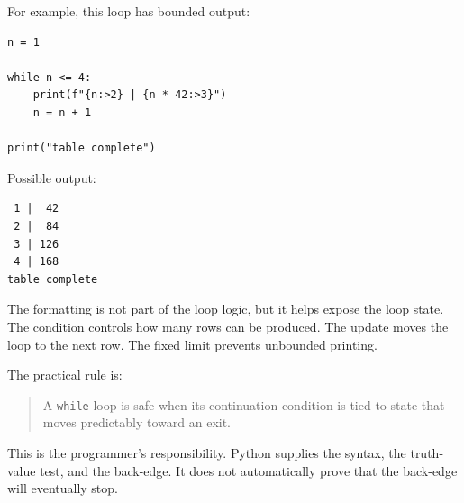 For example, this loop has bounded output:

\begin{verbatim}
n = 1

while n <= 4:
    print(f"{n:>2} | {n * 42:>3}")
    n = n + 1

print("table complete")
\end{verbatim}

Possible output:

\begin{verbatim}
 1 |  42
 2 |  84
 3 | 126
 4 | 168
table complete
\end{verbatim}

The formatting is not part of the loop logic, but it helps expose the loop state. The condition controls how many rows can be produced. The update moves the loop to the next row. The fixed limit prevents unbounded printing.

The practical rule is:

\begin{quote}
A \texttt{while} loop is safe when its continuation condition is tied to state that moves predictably toward an exit.
\end{quote}

This is the programmer's responsibility. Python supplies the syntax, the truth-value test, and the back-edge. It does not automatically prove that the back-edge will eventually stop.